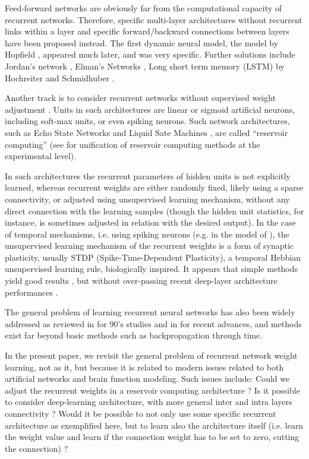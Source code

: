 Feed-forward networks are obviously far from the computational
capacity of recurrent networks. Therefore, specific multi-layer
architectures without recurrent links within a layer and specific
forward/backward connections between layers have been proposed
instead. The first dynamic neural model, the model by Hopfield
\cite{hopfield:82}, appeared much later, and was very specific.
Further solutions include Jordan's network \cite{jordan:86}, Elman's
Networks \cite{elman:90}, Long short term memory (LSTM) by Hochreiter
and Schmidhuber \cite{hochreiter-schmidhuber:97}.

Another track is to consider recurrent networks without supervised
weight adjustment \cite{verstraeten-etal:07}. Units in such
architectures are linear or sigmoid artificial neurons, including
soft-max units, or even spiking neurons. Such network architectures,
such as Echo State Networks \cite{jaeger:03} and Liquid Sate Machines
\cite{maass-etal:02}, are called ``reservoir computing'' (see
\cite{verstraeten-etal:07} for unification of reservoir computing
methods at the experimental level).

In such architectures the recurrent parameters of hidden units is not
explicitly learned, whereas recurrent weights are either randomly
fixed, likely using a sparse connectivity, or adjusted using
unsupervised learning mechanism, without any direct connection with
the learning samples (though the hidden unit statistics, for instance,
is sometimes adjusted in relation with the desired output). In the
case of temporal mechanisms, i.e. using spiking neurons (e.g. in the
model of \cite{paugam-moisy-etal:08}), the unsupervised learning
mechanism of the recurrent weights is a form of synaptic plasticity,
usually STDP (Spike-Time-Dependent Plasticity), a temporal Hebbian
unsupervised learning rule, biologically inspired. It appears that
simple methods yield good results \cite{verstraeten-etal:07}, but
without over-passing recent deep-layer architecture performances
\cite{Deng:2014}.

The general problem of learning recurrent neural networks has also
been widely addressed as reviewed in \cite{cun_theoretical_1988} for
90's studies and in \cite{martens_learning_2016} for recent advances,
and methods exist far beyond basic methods such as backpropagation
through time. 

In the present paper, we revisit the general problem of recurrent
network weight learning, not as it, but because it is
related to modern issues related to both artificial networks and brain
function modeling. Such issues include: Could we adjust the recurrent
weights in a reservoir computing architecture ?  Is it possible to
consider deep-learning architecture, with more general inter and intra
layers connectivity ? Would it be possible to not only use some
specific recurrent architecture as exemplified here, but to learn also
the architecture itself (i.e. learn the weight value and learn if the
connection weight has to be set to zero, cutting the connection) ?

